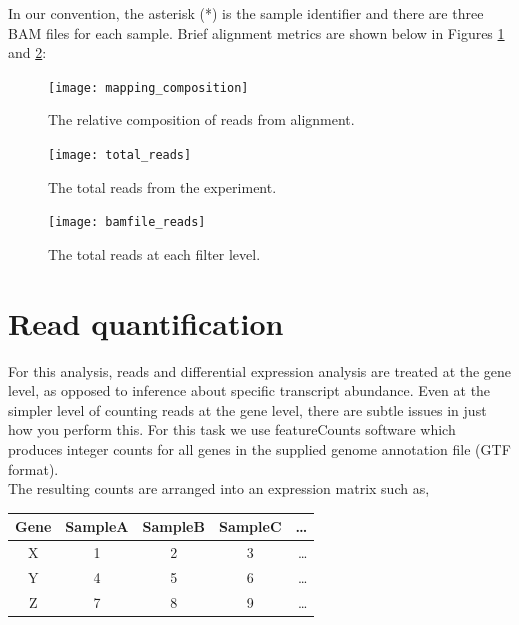 \documentclass{article}
\begin{document}
{In our convention, the asterisk (*) is the sample identifier and there are three BAM files for each sample.
Brief alignment metrics are shown below in Figures \ref{fig:relative_composition} and \ref{fig:total_counts}:

\begin{figure}[ht!]
  \centering
    \texttt{[image: mapping\_composition]}
    \caption{The relative composition of reads from alignment.}
    \label{fig:relative_composition}
\end{figure}

\begin{figure}[ht!]
  \centering
    \texttt{[image: total\_reads]}
    \caption{The total reads from the experiment.}
     \label{fig:total_counts}
\end{figure}

\begin{figure}[ht!]
  \centering
    \texttt{[image: bamfile\_reads]}
    \caption{The total reads at each filter level.}
     \label{fig:bam_level_counts}
\end{figure}

{%

\section{Read quantification}

For this analysis, reads and differential expression analysis are treated at the gene level, as opposed to inference about specific transcript abundance.  Even at the simpler level of counting reads at the gene level, there are subtle issues in just how you perform this.  For this task we use featureCounts software \cite{featureCounts} which produces integer counts for all genes in the supplied genome annotation file (GTF format).  \\

The resulting counts are arranged into an expression matrix such as,
\begin{center}
\begin{tabular}{c || c | c | c | r }
  Gene & SampleA & SampleB & SampleC & \ldots \\
  \hline			
  X & 1 & 2 & 3 & \ldots \\
  Y & 4 & 5 & 6 & \ldots\\
  Z & 7 & 8 & 9 & \ldots\\
  \hline  
\end{tabular}
\end{center}

}}
\end{document}
